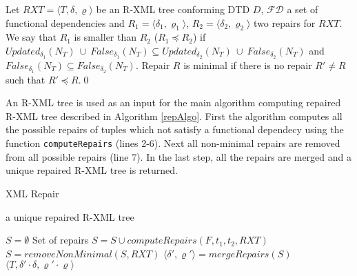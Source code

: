 \begin{define}
Let $RXT = \langle T, \delta, \varrho \rangle$ be an R-XML tree conforming DTD $D$, $\mathcal{FD}$ a set of functional dependencies and $R_1 = \langle \delta_1, \varrho_1 \rangle$, $R_2 = \langle \delta_2, \varrho_2 \rangle$ two repairs for $RXT$. We say that $R_1$ is smaller than $R_2$ ($R_1 \preceq R_2$) if $Updated_{\delta_1}(N_T)\ \cup\ False_{\delta_1}(N_T) \subseteq Updated_{\delta_2}(N_T)\ \cup\ False_{\delta_2}(N_T)$ and $False_{\delta_1}(N_T) \subseteq False_{\delta_2}(N_T)$. Repair $R$ is minimal if there is no repair $R' \neq R$ such that $R' \preceq R$.\qed
\end{define}

An R-XML tree is used as an input for the main algorithm computing repaired R-XML tree described in Algorithm \ref{repAlgo}. First the algorithm computes all the possible repairs of tuples which not satisfy a functional dependecy using the function \texttt{computeRepairs} (lines 2-6). Next all non-minimal repairs are removed from all possible repairs (line 7). In the last step, all the repairs are merged and a unique repaired R-XML tree is returned.

\begin{algorithm}[H]
\caption{XML Repair}
\label{repAlgo}
\begin{algorithmic}[1]
\ENSURE a unique repaired R-XML tree

\STATE $S = \emptyset$ \COMMENT Set of repairs
		\STATE $S = S \cup computeRepairs(F, t_1, t_2, RXT)$
	\ENDFOR
\ENDFOR
\STATE $S = removeNonMinimal(S, RXT)$
\STATE $\langle \delta', \varrho' \rangle = mergeRepairs(S)$
\RETURN $\langle T, \delta' \cdot \delta, \varrho' \cdot \varrho \rangle$
\end{algorithmic}
\end{algorithm}

